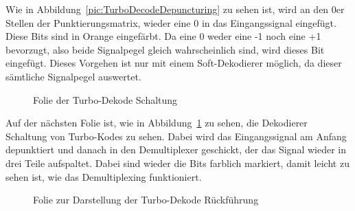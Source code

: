 Wie in Abbildung~\ref{pic:TurboDecodeDepuncturing} zu sehen ist, wird an den 0er Stellen der Punktierungsmatrix, wieder eine 0 in das Eingangssignal eingefügt. Diese Bits sind in Orange eingefärbt. Da eine 0 weder eine -1 noch eine +1 bevorzugt, also beide Signalpegel gleich wahrscheinlich sind, wird dieses Bit eingefügt. Dieses Vorgehen ist nur mit einem Soft-Dekodierer möglich, da dieser sämtliche Signalpegel auswertet. 

\begin{figure}[th]
\centering
{}
\caption{Folie der Turbo-Dekode Schaltung}
\label{pic:TurboDecode}
\end{figure}

Auf der nächsten Folie ist, wie in Abbildung~\ref{pic:TurboDecode} zu sehen, die Dekodierer Schaltung von Turbo-Kodes zu sehen. Dabei wird das Eingangssignal am Anfang depunktiert und danach in den Demultiplexer geschickt, der das Signal wieder in drei Teile aufspaltet. Dabei sind wieder die Bits farblich markiert, damit leicht zu sehen ist, wie das Demultiplexing funktioniert.

\begin{figure}[th]
\centering
{}
\caption{Folie zur Darstellung der Turbo-Dekode Rückführung}
\label{pic:TurboDecodeBack}
\end{figure}

